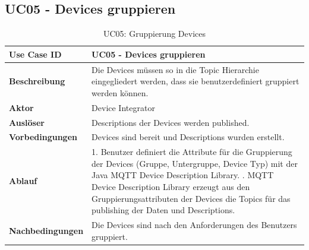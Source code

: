 \subsection{UC05 - Devices gruppieren}

\begin{table}[H]
\begin{tabularx}{\textwidth}{|l|X|}

 \hline
 {\bf Use Case ID }    & UC05 - Devices gruppieren \\  \hline
 {\bf Beschreibung }   & Die Devices müssen so in die Topic Hierarchie eingegliedert werden, dass sie benutzerdefiniert gruppiert werden können. \\ \hline
 {\bf Aktor }          & Device Integrator \\ \hline
 {\bf Auslöser }       & Descriptions der Devices werden published. \\ \hline
 {\bf Vorbedingungen } & Devices sind bereit und Descriptions wurden erstellt. \\ \hline
 {\bf Ablauf }         & 
  1. Benutzer definiert die Attribute für die Gruppierung der Devices (Gruppe, Untergruppe, Device Typ) mit der Java MQTT Device Description Library. \newline
  2. MQTT Device Description Library erzeugt aus den Gruppierungsattributen der Devices die Topics für das publishing der Daten und Descriptions. \\ \hline
 {\bf Nachbedingungen} & Die Devices sind nach den Anforderungen des Benutzers gruppiert. \\ \hline
  
\end{tabularx}
\caption{UC05: Gruppierung Devices}
\end{table}

